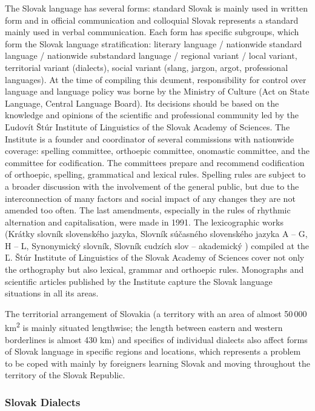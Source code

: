 \begin{multicols}{2}
The Slovak language has several forms: standard Slovak is mainly used in
written form and in official communication and colloquial Slovak represents a
standard mainly used in verbal communication. Each form has specific subgroups,
which form the Slovak language stratification: literary language / nationwide
standard language / nationwide substandard language / regional variant / local
variant, territorial variant (dialects), social variant (slang, jargon, argot,
professional languages). At the time of compiling this dcument, responsibility
for control over language and language policy was borne by the Ministry of
Culture (Act on State Language, Central Language Board). Its decisions should
be based on the knowledge and opinions of the scientific and professional
community led by the Ľudovít Štúr Institute of Linguistics of the Slovak
Academy of Sciences. The Institute is a founder and coordinator of several
commissions with nationwide coverage: spelling committee, orthoepic committee,
onomastic committee, and the committee for codification. The committees prepare
and recommend codification of orthoepic, spelling, grammatical and lexical
rules. Spelling rules are subject to a broader discussion with the involvement
of the general public, but due to the interconnection of many factors and
social impact of any changes they are not amended too often. The last
amendments, especially in the rules of rhythmic alternation and capitalisation,
were made in 1991. The lexicographic works (Krátky slovník slovenského jazyka,
Slovník súčasného slovenského jazyka A -- G, H -- L, Synonymický slovník,
Slovník cudzích slov -- akademický
\cite{kssj2003,sssj2006,sssj2011,sss2004,scs2005}) compiled at the Ľ. Štúr Institute of
Linguistics of the Slovak Academy of Sciences cover not only the orthography
but also lexical, grammar and orthoepic rules. Monographs and scientific
articles published by the Institute capture the Slovak language situations in
all its areas. 

The territorial arrangement of Slovakia (a territory with an area of
almost 50\,000 km\textsuperscript{2} is mainly situated lengthwise; the
length between eastern and western borderlines is almost 430 km) and
specifics of individual dialects also affect forms of Slovak language in
specific regions and locations, which represents a problem to be coped
with mainly by foreigners learning Slovak and moving throughout the
territory of the Slovak Republic.


\subsubsection{Slovak Dialects}


\end{multicols}
